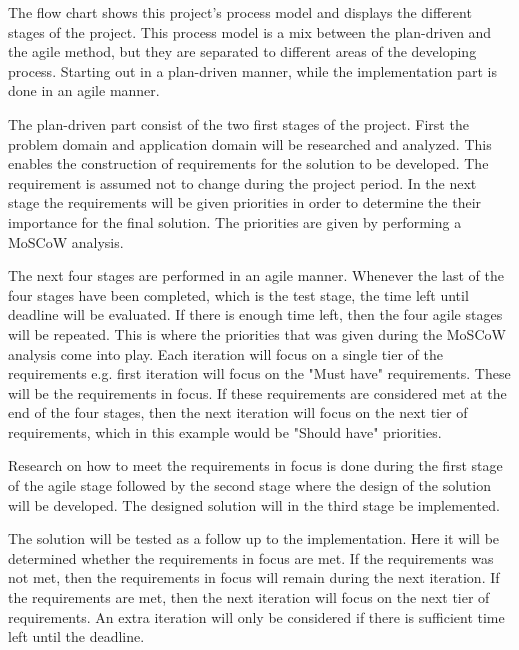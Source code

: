The  flow chart shows this project's process model and displays the different stages of the project. This process model is a mix between the plan-driven and the agile method, but they are separated to different areas of the developing process. Starting out in a plan-driven manner, while the implementation part is done in an agile manner.

The plan-driven part consist of the two first stages of the project. First the problem domain and application domain will be researched and analyzed. This enables the construction of requirements for the solution to be developed. The requirement is assumed not to change during the project period. In the next stage the requirements will be given priorities in order to determine the their importance for the final solution. The priorities are given by performing a MoSCoW analysis.

The next four stages are performed in an agile manner. Whenever the last of the four stages have been completed, which is the test stage, the time left until deadline will be evaluated. If there is enough time left, then the four agile stages will be repeated. This is where the priorities that was given during the MoSCoW analysis come into play. Each iteration will focus on a single tier of the requirements e.g. first iteration will focus on the "Must have" requirements. These will be the requirements in focus. If these requirements are considered met at the end of the four stages, then the next iteration will focus on the next tier of requirements, which in this example would be "Should have" priorities.

Research on how to meet the requirements in focus is done during the first stage of the agile stage followed by the second stage where the design of the solution will be developed. The designed solution will in the third stage be implemented.

The solution will be tested as a follow up to the implementation. Here it will be determined whether the requirements in focus are met. If the requirements was not met, then the requirements in focus will remain during the next iteration. If the requirements are met, then the next iteration will focus on the next tier of requirements. An extra iteration will only be considered if there is sufficient time left until the deadline.

